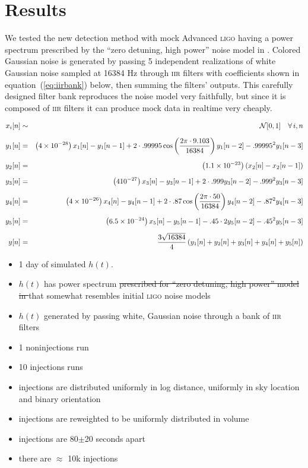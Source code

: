\section{Results}
\label{SECIV}\label{sec:results}

We tested the new detection method with mock Advanced \textsc{ligo} having a power spectrum prescribed by the ``zero detuning, high power'' noise model in \cite{Shoemaker:2009p9770}.  Colored Gaussian noise is generated by passing 5 independent realizations of white Gaussian noise sampled at 16384 Hz through \textsc{iir} filters with coefficients shown in equation~(\ref{eq:iirbank}) below, then summing the filters' outputs.  This carefully designed filter bank reproduces the noise model very faithfully, but since it is composed of \textsc{iir} filters it can produce mock data in realtime very cheaply.

\begin{eqnarray}
\label{eq:iirbank}
x_i &[n] \sim& \mathcal{N}[0, 1] \quad \forall \, i, n \nonumber\\\noalign{\vskip 2mm}
y_1 &[n] =& \left(4 \times 10^{-28}\right) x_1[n] - y_1[n-1] + 2 \cdot .99995 \cos \left(\frac{2\pi \cdot 9.103}{16384}\right) y_1[n-2] - .99995^2 y_1[n-3] \nonumber\\\noalign{\vskip 2mm}
y_2 &[n] =& \left(1.1 \times 10^{-23}\right) (x_2[n] - x_2[n-1]) \nonumber\\\noalign{\vskip 2mm}
y_3 &[n] =& \left(4 10^{-27}\right) x_3[n] - y_3[n-1] + 2 \cdot .999 y_3[n-2] - .999^2 y_3[n-3] \nonumber\\\noalign{\vskip 2mm}
y_4 &[n] =& \left(4 \times 10^{-26}\right) x_4[n] - y_4[n-1] + 2 \cdot .87 \cos \left(\frac{2\pi \cdot 50}{16384}\right) y_4[n-2] - .87 ^ 2 y_4[n-3] \nonumber\\\noalign{\vskip 2mm}
y_5 &[n] =& \left(6.5 \times 10^{-24}\right) x_5[n] - y_5[n-1] - .45 \cdot 2 y_5[n-2] - .45 ^ 2 y_5[n-3] \nonumber\\\noalign{\vskip 2mm}
\; y &[n] =& \frac{3\sqrt{16384}}{4} \left(y_1[n] + y_2[n] + y_3[n] + y_4[n] + y_5[n]\right)
\end{eqnarray}

\begin{itemize}
\item 1 day of simulated $h(t)$.
\item $h(t)$ has power spectrum \sout{prescribed for ``zero detuning, high power'' model in \cite{Shoemaker:2009p9770}} that somewhat resembles initial \textsc{ligo} noise models
\item $h(t)$ generated by passing white, Gaussian noise through a bank of \textsc{iir} filters
\item 1 noninjections run
\item 10 injections runs
\item injections are distributed uniformly in log distance, uniformly in sky location and binary orientation
\item injections are reweighted to be uniformly distributed in volume
\item injections are 80$\pm$20 seconds apart
\item there are $\approx$ 10k injections
\end{itemize}

